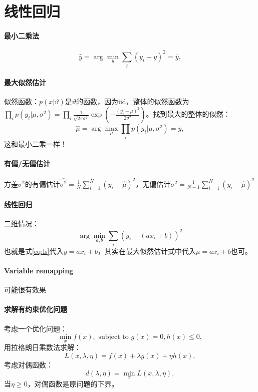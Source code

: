 \section{线性回归}

\paragraph{最小二乘法}
\begin{equation}
    \hat{y} = \arg \min_y \sum_i (y_i - y)^2 = \bar{y},\label{eq:ls}
\end{equation}

\paragraph{最大似然估计} 似然函数：$p(x|\vartheta)$是$\vartheta$的函数，因为iid，整体的似然函数为$\prod_i p(y_i|\mu, \sigma^2) = \prod_i \frac{1}{\sqrt{2\pi\sigma^2}}\exp\left(-\frac{(y_i-\mu)^2}{2\sigma^2}\right)$。找到最大的整体的似然：
$$\hat{\mu} = \arg\max_\mu\prod_i p(y_i|\mu, \sigma^2) = \bar{y},$$这和最小二乘一样！

\paragraph{有偏/无偏估计} 方差$\sigma^2$的有偏估计$\hat{\sigma^2}=\frac{1}{N}\sum_{i=1}^N(y_i-\hat{\mu})^2$，无偏估计$\tilde{\sigma^2}=\frac{1}{N-1}\sum_{i=1}^N(y_i-\hat{\mu})^2$

\paragraph{线性回归}
二维情况：$$\arg\min_{a,b}\sum_i(y_i-(ax_i + b))^2$$
也就是式\ref{eq:ls}代入$y=ax_i + b$，其实在最大似然估计式中代入$\mu=ax_i + b$也可。

\paragraph{Variable remapping} 可能很有效果

\paragraph{求解有约束优化问题} 考虑一个优化问题：
$$\min_x f(x),\text{ subject to }g(x) = 0, h(x) \le 0,$$
用拉格朗日乘数法求解：
$$L(x,\lambda,\eta)=f(x)+\lambda g(x)+\eta h(x),$$
考虑对偶函数：
$$d(\lambda,\eta)=\min_xL(x,\lambda,\eta),$$
当$\eta \ge 0$，对偶函数是原问题的下界。

